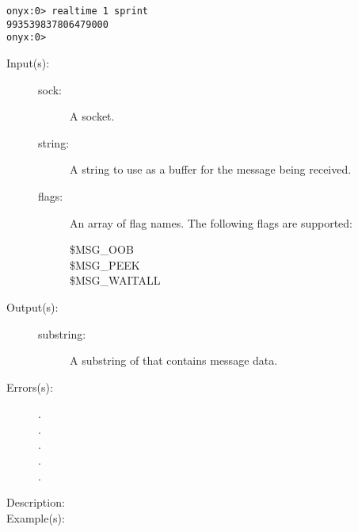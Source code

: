 \begin{description}
\begin{description}
\begin{verbatim}
onyx:0> realtime 1 sprint
993539837806479000
onyx:0>
		\end{verbatim}
	\end{description}
\label{systemdict:recv}
\item[{\onyxop{sock string flags}{recv}{substring}}: ]
\item[{\onyxop{sock string}{recv}{substring}}: ]
	\begin{description}\item[]
	\item[Input(s): ]
		\begin{description}\item[]
		\item[sock: ]
			A socket.
		\item[string: ]
			A string to use as a buffer for the message being
			received.
		\item[flags: ]
			An array of flag names.  The following flags are
			supported:
			\begin{description}%
			\item[\$MSG\_OOB]
			\item[\$MSG\_PEEK]
			\item[\$MSG\_WAITALL]
			\end{description}
		\end{description}
	\item[Output(s): ]
		\begin{description}\item[]
		\item[substring: ]
			A substring of  that contains message
			data.
		\end{description}
	\item[Errors(s): ]
		\begin{description}\item[]
		\item[.]
		\item[.]
		\item[.]
		\item[.]
		\item[.]
		\end{description}
	\item[Description: ]
	\item[Example(s): ]\begin{verbatim}


\end{verbatim}
\end{description}
\end{description}
